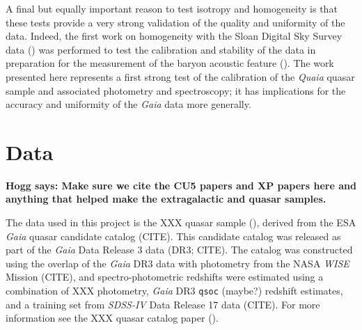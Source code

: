\documentclass[modern]{aastex631}
\newcommand{\hogg}[1]{\textbf{Hogg says: #1}}
\begin{document}
A final but equally important reason to test isotropy and homogeneity is that these tests provide a very strong validation of the quality and uniformity of the data.
Indeed, the first work on homogeneity with the Sloan Digital Sky Survey data (\citealt{hogg05}) was performed to test the calibration and stability of the data in preparation for the measurement of the baryon acoustic feature (\citealt{baf}).
The work presented here represents a first strong test of the calibration of the \textsl{Quaia} quasar sample and associated photometry and spectroscopy; it has implications for the accuracy and uniformity of the \textsl{Gaia} data more generally.

\section{Data}\label{sec:data}\noindent
\hogg{Make sure we cite the CU5 papers and XP papers here and anything that helped make the extragalactic and quasar samples.}

The data used in this project is the XXX quasar sample (\citealt{ksf}), derived from the ESA \textsl{Gaia} quasar candidate catalog (CITE).
This candidate catalog was released as part of the \textsl{Gaia} Data Release 3 data (DR3; CITE).
The catalog was constructed using the overlap of the \textsl{Gaia} DR3 data with photometry from the NASA \textsl{WISE} Mission (CITE), and spectro-photometric redshifts were estimated using a combination of XXX photometry, \textsl{Gaia} DR3 \texttt{qsoc} (maybe?) redshift estimates, and a training set from \textsl{SDSS-IV} Data Release 17 data (CITE).
For more information see the XXX quasar catalog paper (\citealt{ksf}).
\end{document}
